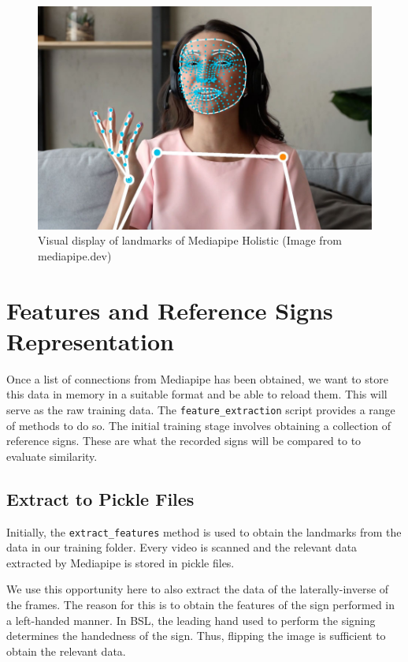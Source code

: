 \documentclass[final,rdr32.tex]{subfiles}
\begin{document}
\begin{figure}[H]
    \begin{center}
        \includegraphics[scale=0.3]{images/holistic.jpg}
        \caption[caption]{Visual display of landmarks of Mediapipe Holistic (Image from mediapipe.dev)}
    \end{center}
\end{figure}



\section{Features and Reference Signs Representation}
\label{sec:feature}

Once a list of connections from Mediapipe has been obtained, we want to store this data in memory in a suitable format and be able to reload them. This will serve as the raw training data. The \verb|feature_extraction| script provides a range of methods to do so. The initial training stage involves obtaining a collection of reference signs. These are what the recorded signs will be compared to to evaluate similarity.

\subsection{Extract to Pickle Files}

Initially, the \verb|extract_features| method is used to obtain the landmarks from the data in our training folder. Every video is scanned and the relevant data extracted by Mediapipe is stored in pickle files.

We use this opportunity here to also extract the data of the laterally-inverse of the frames. The reason for this is to obtain the features of the sign performed in a left-handed manner. In BSL, the leading hand used to perform the signing determines the handedness of the sign. Thus, flipping the image is sufficient to obtain the relevant data.
\end{document}
